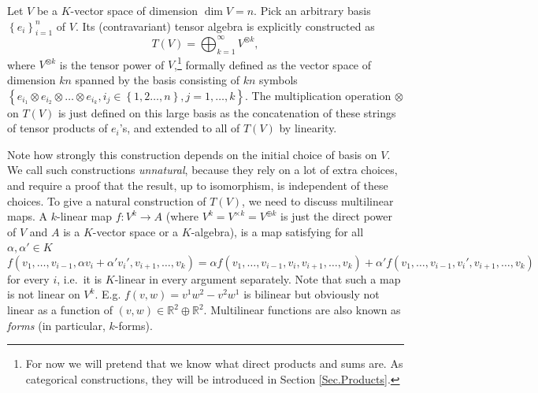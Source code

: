 \documentclass[english,letterpaper]{article}%
\numberwithin{equation}{section}
\numberwithin{figure}{section}
\numberwithin{table}{section}
\theoremstyle{definition}
\theoremstyle{definition}
\theoremstyle{definition}
\theoremstyle{plain}
\theoremstyle{plain}
\theoremstyle{plain}
\theoremstyle{plain}
\theoremstyle{remark}
\theoremstyle{remark}
\begin{document}
\begin{example}\label{Tensor algebra}
Let $V$ be a $K$-vector space of dimension $\dim V=n$. Pick an
arbitrary basis $\left\{ e_{i}\right\} _{i=1}^{n}$ of $V$. Its (contravariant)
tensor algebra is explicitly constructed as 
\begin{equation}
T\left(V\right)=\bigoplus_{k=1}^{\infty}V^{\otimes k},\label{eq: tensor alg}
\end{equation}
where $V^{\otimes k}$ is the tensor power of $V$,\footnote{For now we will pretend that we know what direct products and sums are. As categorical constructions, they will be introduced in Section \ref{Sec.Products}.} formally defined
as the vector space of dimension $kn$ spanned by the basis consisting
of $kn$ symbols $\left\{ e_{i_{1}}\otimes e_{i_{2}}\otimes\ldots\otimes e_{i_{k}},i_{j}\in\left\{ 1,2\ldots,n\right\} ,j=1,\ldots,k\right\} $.
The multiplication operation $\otimes$ on $T(V)$ is just defined
on this large basis as the concatenation of these strings of tensor products
of $e_{i}$'s, and extended to all of $T\left(V\right)$ by linearity.

Note how strongly this construction depends on the initial choice
of basis on $V$. We call such constructions \emph{unnatural}, because
they rely on a lot of extra choices, and require a proof that the
result, up to isomorphism, is independent of these choices. To give
a natural construction of $T\left(V\right)$, we need to discuss multilinear
maps. A $k$-linear map $f:V^{k}\to A$ (where $V^k=V^{\times k}=V^{\oplus k}$ is just the direct power of $V$ and $A$ is a $K$-vector space or a $K$-algebra),
is a map satisfying for all $\alpha,\alpha'\in K$
\[
f\left(v_{1},\ldots,v_{i-1},\alpha v_{i}+\alpha'v_{i}',v_{i+1},\ldots,v_{k}\right)=\alpha f\left(v_{1},\ldots,v_{i-1},v_{i},v_{i+1},\ldots,v_{k}\right)+\alpha'f\left(v_{1},\ldots,v_{i-1},v_{i}',v_{i+1},\ldots,v_{k}\right)
\]
for every $i$, i.e.\ it is $K$-linear in every argument separately.
Note that such a map is not linear on $V^{k}$. E.g. $f\left(v,w\right)=v^1w^2-v^2w^1$ is bilinear but obviously not linear as a function of $(v,w)\in \mathbb{R}^{2}\oplus \mathbb{R}^2$. Multilinear functions are also known as \emph{forms} (in particular, $k$-forms).


\end{example}
\end{document}
